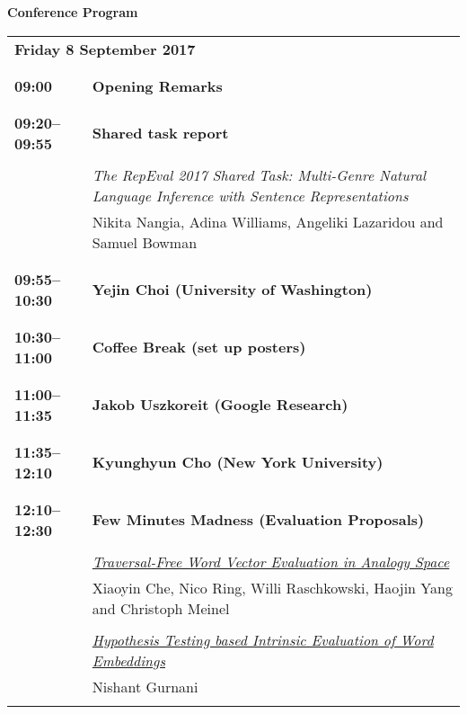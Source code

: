 \setlength{\parindent}{0in}
\setlength{\parskip}{2ex}
\renewcommand{\baselinestretch}{0.87}

\begin{center}
{\Large \bf
  Conference Program
}
\end{center}
\vspace{3mm}
\begin{tabular}{p{20mm}p{128mm}}
\multicolumn{2}{l}{\bf Friday 8 September 2017} \\
\\
\\{\bf 09:00} & {\bf Opening Remarks} \\
\\
\\{\bf 09:20--09:55} & {\bf Shared task report} \\
\\
 & {\em The RepEval 2017 Shared Task: Multi-Genre Natural Language Inference with Sentence Representations}\\
         & Nikita Nangia, Adina Williams, Angeliki Lazaridou and Samuel Bowman \\
\\

\\{\bf 09:55--10:30} & {\bf Yejin Choi (University of Washington)} \\
\\
\\{\bf 10:30--11:00} & {\bf Coffee Break (set up posters)} \\
\\
\\{\bf 11:00--11:35} & {\bf Jakob Uszkoreit (Google Research)} \\
\\
\\{\bf 11:35--12:10} & {\bf Kyunghyun Cho (New York University)} \\
\\
\\{\bf 12:10--12:30} & {\bf Few Minutes Madness (Evaluation Proposals)} \\
\\
 & \hyperlink{page.1}{\em Traversal-Free Word Vector Evaluation in Analogy Space}\\
         & Xiaoyin Che, Nico Ring, Willi Raschkowski, Haojin Yang and Christoph Meinel \\
\\

 & \hyperlink{page.6}{\em Hypothesis Testing based Intrinsic Evaluation of Word Embeddings}\\
         & Nishant Gurnani \\
\\


\end{tabular}
